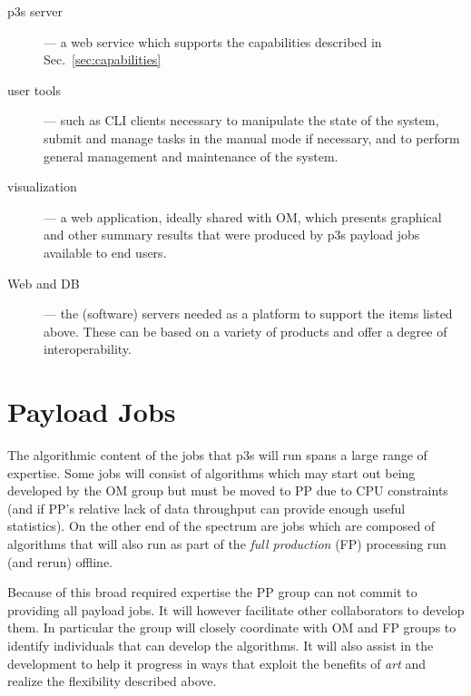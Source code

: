 \documentclass[pdftex,12pt,letter]{article}
\begin{document}
\begin{description}
\item[p3s server] --- a web service which supports the capabilities
  described in Sec.~\ref{sec:capabilities}

\item[user tools] --- such as CLI clients necessary to manipulate the
  state of the system, submit and manage tasks in the manual mode if
  necessary, and to perform general management and maintenance of the
  system.

\item[visualization] --- a web application, ideally shared with OM,
  which presents graphical and other summary results that were
  produced by p3s payload jobs available to end users.


\item[Web and DB] --- the (software) servers needed as a platform to
  support the items listed above. These can be based on a variety of
  products and offer a degree of interoperability.

\end{description}




\section{Payload Jobs}
\label{sec:categories}

The algorithmic content of the jobs that p3s will run spans a large
range of expertise.  Some jobs will consist of algorithms which may
start out being developed by the OM group but must be moved to PP due
to CPU constraints (and if PP's relative lack of data throughput can
provide enough useful statistics).  On the other end of the spectrum
are jobs which are composed of algorithms that will also run as part
of the \textit{full production} (FP) processing run (and rerun)
offline.

Because of this broad required expertise the PP group can not commit
to providing all payload jobs.  It will however facilitate other
collaborators to develop them.  In particular the group will closely
coordinate with OM and FP groups to identify individuals that can
develop the algorithms.  It will also assist in the development to
help it progress in ways that exploit the benefits of \textit{art} and
realize the flexibility described above.
\end{document}
